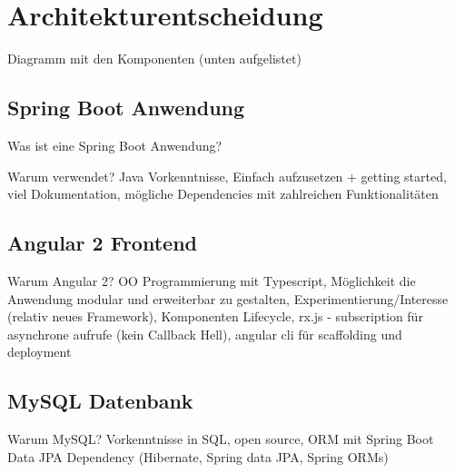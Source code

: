 \section{Architekturentscheidung}\label{arch_decission}
Diagramm mit den Komponenten (unten aufgelistet)

\subsection{Spring Boot Anwendung}
Was ist eine Spring Boot Anwendung?

Warum verwendet? Java Vorkenntnisse, Einfach aufzusetzen + getting started, viel Dokumentation, mögliche Dependencies mit zahlreichen Funktionalitäten

\subsection{Angular 2 Frontend}
Warum Angular 2? OO Programmierung mit Typescript, Möglichkeit die Anwendung modular und erweiterbar zu gestalten, Experimentierung/Interesse (relativ neues Framework), Komponenten Lifecycle, rx.js - subscription für asynchrone aufrufe (kein Callback Hell), angular cli für scaffolding und deployment

\subsection{MySQL Datenbank}
Warum MySQL? Vorkenntnisse in SQL, open source, ORM mit Spring Boot Data JPA Dependency (Hibernate, Spring data JPA, Spring ORMs)